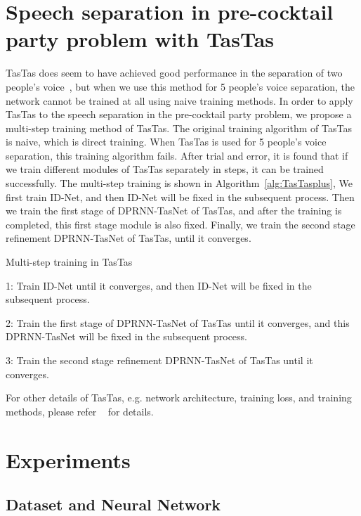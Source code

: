 \documentclass{article}
\numberwithin{equation}{section}
\theoremstyle{remark}
\begin{document}
\section{Speech separation in pre-cocktail party problem with TasTas}
\label{sec:tastasplus}


TasTas does seem to have achieved good performance in the separation of two 
people's voice~\cite{shi2020speech}, but when we use this method for 5 people's voice
separation, the network cannot be trained at all using naive training methods. 
In order to apply TasTas to the speech separation in the pre-cocktail party problem,
we propose a multi-step training method of TasTas. The original 
training algorithm of TasTas is naive, which is direct training.
When TasTas is used for  5 people's voice separation, this training algorithm fails. 
After trial and error, it is found that if we
train different modules of TasTas  separately in steps, it can be trained successfully. The  multi-step training is shown in Algorithm~\ref{alg:TasTasplus},
We first train ID-Net, and then ID-Net will be fixed in the subsequent process. Then we train the first stage of DPRNN-TasNet of TasTas,
and after the training is completed,
this first stage module is also fixed. Finally, we train the second stage refinement 
DPRNN-TasNet of TasTas, until it converges.


\begin{algorithm}[thp]
  \caption{Multi-step training in TasTas}
  \label{alg:TasTasplus}

  1:  Train ID-Net until it converges, and then ID-Net will be fixed in the subsequent process.


  2:  Train the first stage of DPRNN-TasNet of TasTas until it converges, and this DPRNN-TasNet will be fixed in the subsequent process.

  3: Train the second stage refinement DPRNN-TasNet of TasTas until it converges.

\end{algorithm}

For other details of TasTas, e.g. network architecture, training loss, and training methods, please refer
~\cite{shi2020speech} for details.



\section{Experiments}
\label{sec:experiments}

\subsection{Dataset and Neural Network}
\label{ssec:dataset}
\end{document}
